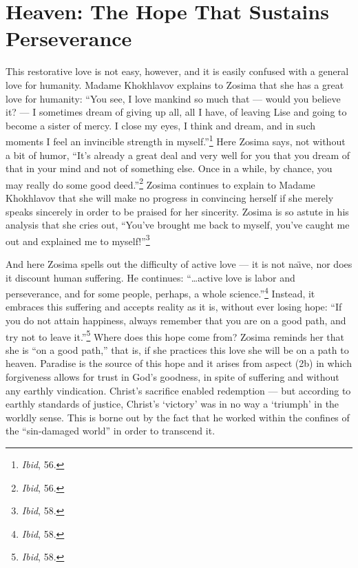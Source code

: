 \section{Heaven: The Hope That Sustains Perseverance}
This restorative love is not easy, however, and it is easily confused with a general love for humanity. Madame Khokhlavov explains to Zosima that she has a great love for humanity: ``You see, I love mankind so much that --- would you believe it? --- I sometimes dream of giving up all, all I have, of leaving Lise and going to become a sister of mercy. I close my eyes, I think and dream, and in such moments I feel an invincible strength in myself.''\footnote{\emph{Ibid}, 56.} Here Zosima says, not without a bit of humor, ``It's already a great deal and very well for you that you dream of that in your mind and not of something else. Once in a while, by chance, you may really do some good deed.''\footnote{\emph{Ibid}, 56.} Zosima continues to explain to Madame Khokhlavov that she will make no progress in convincing herself if she merely speaks sincerely in order to be praised for her sincerity. Zosima is so astute in his analysis that she cries out, ``You've brought me back to myself, you've caught me out and explained me to myself!''\footnote{\emph{Ibid}, 58.}

And here Zosima spells out the difficulty of active love --- it is not na\"{\i}ve, nor does it discount human suffering. He continues: ``\ldots active love is labor and perseverance, and for some people, perhaps, a whole science.''\footnote{\emph{Ibid}, 58.} Instead, it embraces this suffering and accepts reality as it is, without ever losing hope: ``If you do not attain happiness, always remember that you are on a good path, and try not to leave it.''\footnote{\emph{Ibid}, 58.} Where does this hope come from? Zosima reminds her that she is ``on a good path,'' that is, if she practices this love she will be on a path to heaven. Paradise is the source of this hope and it arises from aspect (2b) in which forgiveness allows for trust in God's goodness, in spite of suffering and without any earthly vindication. Christ's sacrifice enabled redemption --- but according to earthly standards of justice, Christ's `victory' was in no way a `triumph' in the worldly sense. This is borne out by the fact that he worked within the confines of the ``sin-damaged world'' in order to transcend it. 

